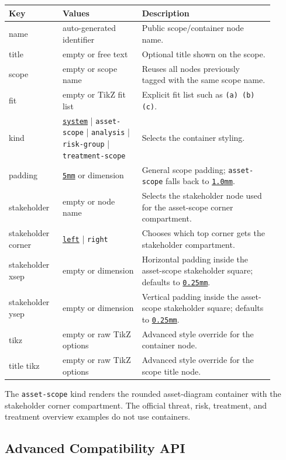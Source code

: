 \documentclass[a4paper]{article}
\newcommand{\keydefault}[1]{\underline{\texttt{#1}}}
\begin{document}
\begin{center}
\begin{tabular}{>{\ttfamily}p{0.18\linewidth}p{0.27\linewidth}p{0.45\linewidth}}
\hline
Key & Values & Description \\
\hline
name & auto-generated identifier & Public scope/container node name. \\
title & empty or free text & Optional title shown on the scope. \\
scope & empty or scope name & Reuses all nodes previously tagged with the same scope name. \\
fit & empty or TikZ fit list & Explicit fit list such as \texttt{(a) (b) (c)}. \\
kind & \keydefault{system} | \texttt{asset-scope} | \texttt{analysis} | \texttt{risk-group} | \texttt{treatment-scope} & Selects the container styling. \\
padding & \keydefault{5mm} or dimension & General scope padding; \texttt{asset-scope} falls back to \keydefault{1.0mm}. \\
stakeholder & empty or node name & Selects the stakeholder node used for the asset-scope corner compartment. \\
stakeholder corner & \keydefault{left} | \texttt{right} & Chooses which top corner gets the stakeholder compartment. \\
stakeholder xsep & empty or dimension & Horizontal padding inside the asset-scope stakeholder square; defaults to \keydefault{0.25mm}. \\
stakeholder ysep & empty or dimension & Vertical padding inside the asset-scope stakeholder square; defaults to \keydefault{0.25mm}. \\
tikz & empty or raw TikZ options & Advanced style override for the container node. \\
title tikz & empty or raw TikZ options & Advanced style override for the scope title node. \\
\hline
\end{tabular}
\end{center}

The \texttt{asset-scope} kind renders the rounded asset-diagram container with
the stakeholder corner compartment. The official threat, risk, treatment, and
treatment overview examples do not use containers.

\subsection{Advanced Compatibility API}
\end{document}
